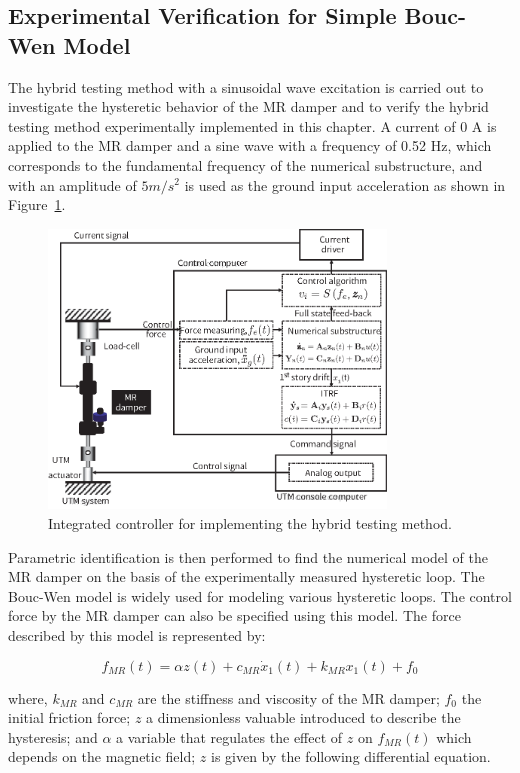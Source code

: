 \subsection{Experimental Verification for Simple Bouc-Wen Model}

The hybrid testing method with a sinusoidal wave excitation is carried out to investigate the hysteretic behavior of the MR damper and to verify the hybrid testing method experimentally implemented in this chapter. A current of 0 A is applied to the MR damper and a sine wave with a frequency of 0.52 Hz, which corresponds to the fundamental frequency of the numerical substructure, and with an amplitude of $5m/s^{2}$ is used as the ground input acceleration as shown in Figure~\ref{fig:8-7}.

\begin{figure}[H]
\centering
\includegraphics[width=0.8\textwidth] {figure/8-7.eps}
\caption{Integrated controller for implementing the hybrid testing method.}
\label{fig:8-7}
\end{figure}

Parametric identification is then performed to find the numerical model of the MR damper on the basis of the experimentally measured hysteretic loop. The Bouc-Wen model is widely used for modeling various hysteretic loops\citep{wen1976method}. The control force by the MR damper can also be specified using this model. The force described by this model is represented by:

\begin{equation}\label{eq:8-13}
f_{MR}(t) = \alpha z(t) + c_{MR}\dot{x}_{1}(t) + k_{MR}x_{1}(t) + f_{0}
\end{equation}

where, $k_{MR}$ and $c_{MR}$ are the stiffness and viscosity of the MR damper; $f_{0}$ the initial friction force; $z$ a dimensionless valuable introduced to describe the hysteresis; and $\alpha$ a variable that regulates the effect of $z$ on $f_{MR}(t)$ which depends on the magnetic field; $z$ is given by the following differential equation.

